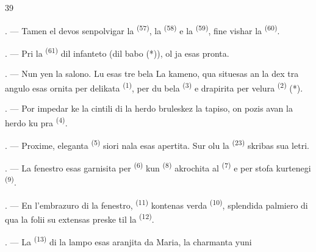 \begin{VUpage}[41]{39}

. --- Tamen el devos senpolvigar la \cc
{} \textsuperscript{(57)}, la  \textsuperscript{(58)} e la \cc
{} \textsuperscript{(59)}, fine vishar la  \textsuperscript{(60)}.

. --- Pri la  \textsuperscript{(61)} dil infanteto (dil\nl
babo (*)), ol ja esas pronta.

\VUsaut{5.0mm}
\VUsaut{3.0mm}

. --- Nun yen la salono. Lu esas tre bela\nl
{} La kameno, qua situesas an la dex\cc
tra angulo esas ornita per delikata  \textsuperscript{(1)},\nl
per du bela  \textsuperscript{(3)} e drapirita per velura \cc
{} \textsuperscript{(2)} (*).

. --- Por impedar ke la cintili di la herdo\nl
bruleskez la tapiso, on pozis avan la herdo ku\cc
pra  \textsuperscript{(4)}.

. --- Proxime, eleganta  \textsuperscript{(5)} siori\cc
nala esas apertita. Sur olu la \cc
{} \textsuperscript{(23)} skribas sua letri.

. --- La fenestro esas garnisita per \nl
{} \textsuperscript{(6)} kun  \textsuperscript{(8)} akrochita al  \textsuperscript{(7)}\nl
e per stofa kurtenegi  \textsuperscript{(9)}.

. --- En l'embrazuro di la fenestro, \cc
{} \textsuperscript{(11)} kontenas verda  \textsuperscript{(10)}, splendida\nl
palmiero di qua la folii su extensas preske til la\nl
{} \textsuperscript{(12)}.

. --- La  \textsuperscript{(13)} di la lampo\nl
esas aranjita da Maria, la charmanta yuni\cc
\parplein
\end{VUpage}

